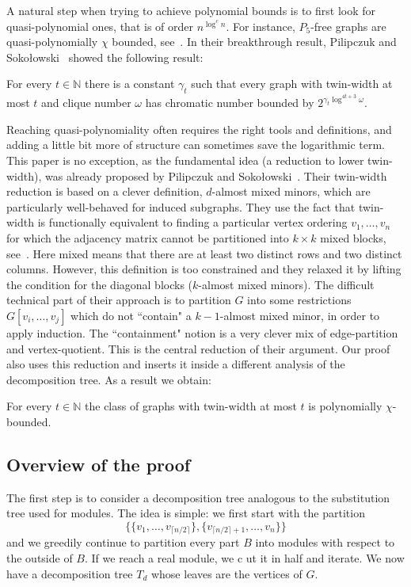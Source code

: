 A natural step when trying to achieve polynomial bounds is to first look for quasi-polynomial ones, that is of order $n^{\log^c n}$. For instance, $P_5$-free graphs are quasi-polynomially $\chi$ bounded, see~\cite{SSS22}. In their breakthrough result, Pilipczuk and Soko\l{}owski~\cite{PS22} showed the following result:

\begin{theorem}\label{th:PS}
For every $t \in \mathbb{N}$ there is a constant $\gamma_t$ such that every graph with twin-width at most $t$ and clique number $\omega$ has chromatic number bounded by $2^{\gamma_t \log^{4t+3}\omega}$.
\end{theorem}

Reaching quasi-polynomiality often requires the right tools and definitions, and adding a little bit more of structure can sometimes save the logarithmic term.
This paper is no exception, as the fundamental idea (a reduction to lower twin-width), was already proposed by Pilipczuk and Soko\l{}owski~\cite{PS22}. Their twin-width reduction is based on a clever definition, $d$-almost mixed minors, which are particularly well-behaved for induced subgraphs. 
They use the fact that twin-width is functionally equivalent to finding a particular vertex ordering $v_1,\dots ,v_n$ for which the adjacency matrix cannot be partitioned into $k\times k$ mixed blocks, see~\cite{BKTW21}. Here mixed means that there are at least two distinct rows and 
two distinct columns. However, this definition is too constrained and they relaxed it by lifting the condition for the diagonal blocks ($k$-almost mixed minors). The difficult technical part of their approach is to partition $G$ into some restrictions $G[v_i,\dots,v_j]$ which do not ``contain" a $k-1$-almost mixed minor, in order to apply induction. The ``containment" notion is a very clever mix of edge-partition and vertex-quotient. This is the central reduction of their argument.
Our proof also uses this reduction and inserts it inside a different analysis of the decomposition tree. As a result we obtain:

\begin{theorem}\label{th:BT}
For every $t \in \mathbb{N}$ the class of graphs with twin-width at most $t$ is polynomially $\chi$-bounded. 
\end{theorem}

\subsection{Overview of the proof}
The first step is to consider a decomposition tree analogous to the substitution tree used for modules. The idea is simple: we first start with the partition $$\{\{v_1, \ldots, v_{\lceil n/2 \rceil}\}, \{v_{\lceil n/2 \rceil + 1}, \ldots, v_n\}\}$$ and we greedily continue to partition every part $B$ into modules with respect to the outside of $B$. If we reach a real module, we c
ut it in half and iterate. We now have a decomposition tree $T_d$ whose leaves are the vertices of $G$.

